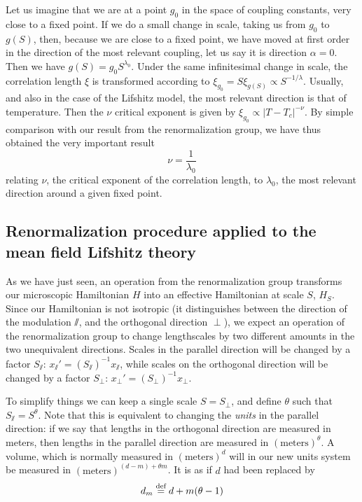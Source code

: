 Let us imagine that we are at a point $g_0$ in the space of coupling constants, very close to a fixed point. If we do a small change in scale, taking us from $g_0$ to $g(S)$, then, because we are close to a fixed point, we have moved at first order in the direction of the most relevant coupling, let us say it is direction $\alpha = 0$. Then we have $ g(S) = g_0 S^{\lambda_0}$.
Under the same infinitesimal change in scale, the correlation length $\xi$ is transformed according to $\xi_{g_0} = S \xi_{g(S)} \propto S^{-1/\lambda}$. Usually, and also in the case of the Lifshitz model, the most relevant direction is that of temperature. Then the $\nu$ critical exponent is given by $\xi_{g_0} \propto |T - T_c|^{-\nu}$. 
By simple comparison with our result from the renormalization group, we have thus obtained the very important result
\begin{equation}
\nu = \frac{1}{\lambda_0}
\end{equation}
relating $\nu$, the critical exponent of the correlation length, to $\lambda_0$, the most relevant direction around a given fixed point.

\subsection{Renormalization procedure applied to the mean field Lifshitz theory}

As we have just seen, an operation from the renormalization group transforms our microscopic Hamiltonian $H$ into an effective Hamiltonian at scale $S$, $H_{S}$. 
Since our Hamiltonian is not isotropic (it distinguishes between the direction of the modulation $\sslash$, and the orthogonal direction $\perp$), we expect an operation of the renormalization group to change lengthscales by two different amounts in the two unequivalent directions. 
Scales in the parallel direction will be changed by a factor $S_\sslash$: $x_\sslash' = (S_\sslash)^{-1} x_\sslash$, while scales on the orthogonal direction will be changed by a factor $S_\perp$: $x_\perp' = (S_\perp)^{-1} x_\perp$.

To simplify things we can keep a single scale $S = S_\perp$, and define $\theta$ such that $S_\sslash = S^\theta$. Note that this is equivalent to changing the \textit{units} in the parallel direction: if we say that lengths in the orthogonal direction are measured in meters, then lengths in the parallel direction are measured in $(\text{meters})^\theta$.
A volume, which is normally measured in $(\text{meters})^d$ will in our new units system be measured in $(\text{meters})^{(d-m) + \theta m}$. It is as if $d$ had been replaced by
\begin{equation}
d_m  \overset{\text{def}}{=}  d+ m(\theta -1)
\end{equation}

